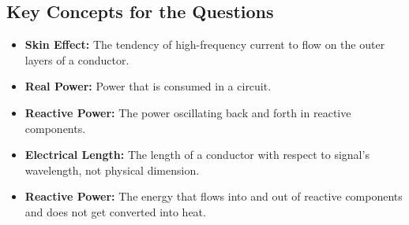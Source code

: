 \subsection*{Key Concepts for the Questions}
\begin{itemize}
    \item \textbf{Skin Effect:} The tendency of high-frequency current to flow on the outer layers of a conductor.
        \item \textbf{Real Power:} Power that is consumed in a circuit.
    \item \textbf{Reactive Power:} The power oscillating back and forth in reactive components.
     \item \textbf{Electrical Length:}  The length of a conductor with respect to signal’s wavelength, not physical dimension.
         \item \textbf{Reactive Power:} The energy that flows into and out of reactive components and does not get converted into heat.
        
\end{itemize}

